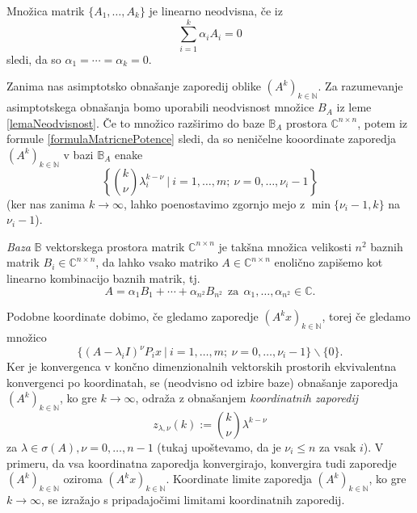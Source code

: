 \documentclass[mat1]{fmfdelo}
\newcommand{\N}{\mathbb N}
\newcommand{\C}{\mathbb C}
\begin{document}
\begin{opomba}
    Množica matrik $\{A_1, \ldots, A_k\}$ je linearno neodvisna, če iz
    \begin{equation*}
        \sum_{i=1}^k \alpha_i A_i = 0
    \end{equation*}
    sledi, da so $\alpha_1 = \cdots = \alpha_k = 0$.
\end{opomba}
Zanima nas asimptotsko obnašanje zaporedij oblike $(A^k)_{k\in\N}$. Za razumevanje asimptotskega obnašanja bomo uporabili neodvisnost množice $B_A$ iz leme \ref{lemaNeodvisnost}. Če to množico razširimo do baze $\mathbb{B}_A$ prostora $\C^{n \times n}$, potem iz formule \eqref{formulaMatricnePotence} sledi, da so neničelne kooordinate zaporedja $(A^k)_{k\in\N}$ v bazi $\mathbb{B}_A$ enake
\begin{equation*}
    \left\{{k \choose \nu} \lambda_i^{k-\nu}\ |\ i = 1, \ldots, m;\ \nu = 0, \ldots, \nu_i-1\right\}
\end{equation*}
(ker nas zanima $k \rightarrow \infty$, lahko poenostavimo zgornjo mejo z $\min\{\nu_i-1, k\}$ na $\nu_i - 1$).
\begin{opomba}
    \emph{Baza} $\mathbb{B}$ vektorskega prostora matrik $\C^{n\times n}$ je takšna množica velikosti $n^2$ baznih matrik $B_i \in \C^{n\times n}$, da lahko vsako matriko $A \in \C^{n\times n}$ enolično zapišemo kot linearno kombinacijo baznih matrik, tj.\ \[A = \alpha_1 B_1 + \cdots + \alpha_{n^2} B_{n^2}\ \ \text{za}\ \ \alpha_1, \ldots, \alpha_{n^2} \in \C.\]
\end{opomba}
Podobne koordinate dobimo, če gledamo zaporedje $(A^k x)_{k\in\N}$, torej če gledamo množico
\begin{equation*}
    \{(A-\lambda_i I)^{\nu} P_i x\ |\ i = 1, \ldots, m;\ \nu = 0, \ldots, \nu_i - 1\} \backslash \{0\}.
\end{equation*}
Ker je konvergenca v končno dimenzionalnih vektorskih prostorih ekvivalentna konvergenci po koordinatah, se (neodvisno od izbire baze) obnašanje zaporedja $(A^k)_{k\in\N}$, ko gre $k \rightarrow \infty$, odraža z obnašanjem \emph{koordinatnih zaporedij}
\begin{equation*}
    z_{\lambda, \nu} (k) := {k \choose \nu} \lambda^{k - \nu}
\end{equation*}
za $\lambda \in \sigma(A), \nu = 0, \ldots, n-1$  (tukaj upoštevamo, da je $\nu_i \leq n$ za vsak $i$). V primeru, da vsa koordinatna zaporedja konvergirajo, konvergira tudi zaporedje $(A^k)_{k\in\N}$ oziroma $(A^k x)_{k\in\N}$. Koordinate limite zaporedja $(A^k)_{k\in\N}$, ko gre $k \rightarrow \infty$, se izražajo s pripadajočimi limitami koordinatnih zaporedij.
\end{document}
